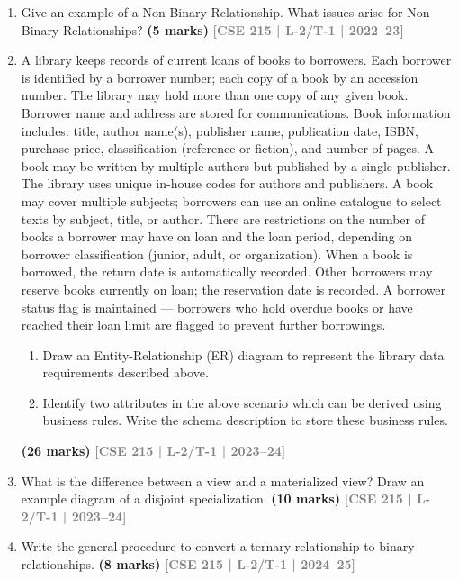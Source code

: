 \documentclass[12pt,a3paper]{article}
\newcommand{\yr}[1]{\hfill\textcolor{gray}{\small\textbf{[#1]}}}
\newcommand{\mk}[1]{\textcolor{orange!70!black}{\small\textbf{(#1 marks)}}}
\begin{document}
\begin{enumerate}
\item Give an example of a Non-Binary Relationship. What issues arise for Non-Binary Relationships?
\mk{5} \yr{CSE 215 | L-2/T-1 | 2022--23}

\item A library keeps records of current loans of books to borrowers. Each borrower is identified by a borrower number; each copy of a book by an accession number. The library may hold more than one copy of any given book. Borrower name and address are stored for communications. Book information includes: title, author name(s), publisher name, publication date, ISBN, purchase price, classification (reference or fiction), and number of pages. A book may be written by multiple authors but published by a single publisher. The library uses unique in-house codes for authors and publishers. A book may cover multiple subjects; borrowers can use an online catalogue to select texts by subject, title, or author. There are restrictions on the number of books a borrower may have on loan and the loan period, depending on borrower classification (junior, adult, or organization). When a book is borrowed, the return date is automatically recorded. Other borrowers may reserve books currently on loan; the reservation date is recorded. A borrower status flag is maintained --- borrowers who hold overdue books or have reached their loan limit are flagged to prevent further borrowings.
\begin{enumerate}
  \item Draw an Entity-Relationship (ER) diagram to represent the library data requirements described above.
  \item Identify two attributes in the above scenario which can be derived using business rules. Write the schema description to store these business rules.
\end{enumerate}
\mk{26} \yr{CSE 215 | L-2/T-1 | 2023--24}

\item What is the difference between a view and a materialized view? Draw an example diagram of a disjoint specialization.
\mk{10} \yr{CSE 215 | L-2/T-1 | 2023--24}

\item Write the general procedure to convert a ternary relationship to binary relationships.
\mk{8} \yr{CSE 215 | L-2/T-1 | 2024--25}


\end{enumerate}
\end{document}
